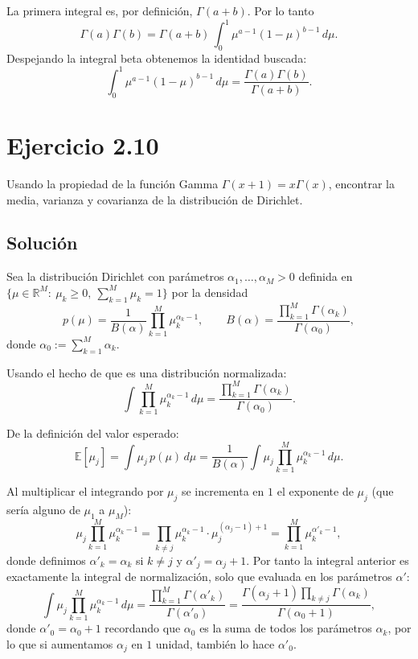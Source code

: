 \documentclass{article}
\begin{document}
La primera integral es, por definición, \(\Gamma(a+b)\). Por lo tanto
\[
\Gamma(a)\Gamma(b)=\Gamma(a+b)\,
\int_{0}^{1} \mu^{a-1}(1-\mu)^{b-1}\,d\mu.
\]
Despejando la integral beta obtenemos la identidad buscada:
\[
\boxed{
\int_{0}^{1} \mu^{a-1}(1-\mu)^{b-1}\,d\mu
=\frac{\Gamma(a)\Gamma(b)}{\Gamma(a+b)}.
}
\]

\section*{Ejercicio 2.10}

Usando la propiedad de la función Gamma
\(\Gamma(x+1)=x\Gamma(x)\), encontrar la media, varianza y covarianza de la distribución de Dirichlet.

\subsection*{Solución}

Sea la distribución Dirichlet con parámetros \(\alpha_1,\dots,\alpha_M>0\) definida en
\(\{\mu\in\mathbb{R}^M:\ \mu_k\ge0,\ \sum_{k=1}^M\mu_k=1\}\) por la densidad
\[
p(\mu)
=\frac{1}{B(\alpha)}\prod_{k=1}^M \mu_k^{\alpha_k-1},
\qquad
B(\alpha)=\frac{\prod_{k=1}^M\Gamma(\alpha_k)}{\Gamma(\alpha_0)},
\]
donde \(\alpha_0:=\sum_{k=1}^M\alpha_k\). 


Usando el hecho de que es una distribución normalizada:
\[
\int\prod_{k=1}^M \mu_k^{\alpha_k-1}\,d\mu
= \frac{\prod_{k=1}^M\Gamma(\alpha_k)}{\Gamma(\alpha_0)}.
\]

De la definición del valor esperado:
\[
\mathbb{E}[\mu_j]
=\int \mu_j\, p(\mu)\,d\mu
=\frac{1}{B(\alpha)} \int \mu_j\prod_{k=1}^M \mu_k^{\alpha_k-1}\,d\mu.
\]

Al multiplicar el integrando por \(\mu_j\) se incrementa en \(1\) el exponente de \(\mu_j\) (que sería alguno de $\mu_1$ a $\mu_M$):
\[
\mu_j\prod_{k=1}^M \mu_k^{\alpha_k-1}
=\prod_{k\neq j}\mu_k^{\alpha_k-1}\cdot \mu_j^{(\alpha_j-1)+1}
=\prod_{k=1}^M \mu_k^{\alpha'_k-1},
\]
donde definimos \(\alpha'_k=\alpha_k\) si \(k\neq j\) y \(\alpha'_j=\alpha_j+1\).
Por tanto la integral anterior es exactamente la integral de normalización, solo que evaluada en los parámetros \(\alpha'\):
\[
\int \mu_j\prod_{k=1}^M \mu_k^{\alpha_k-1}\,d\mu
= \frac{\prod_{k=1}^M\Gamma(\alpha'_k)}{\Gamma(\alpha'_0)}
= \frac{\Gamma(\alpha_j+1)\prod_{k\neq j}\Gamma(\alpha_k)}{\Gamma(\alpha_0+1)},
\]
donde \(\alpha'_0=\alpha_0+1\) recordando que \(\alpha_0\) es la suma de todos los parámetros \(\alpha_k\), por lo que si aumentamos \(\alpha_j\) en $1$ unidad, también lo hace \(\alpha'_0\). 
\end{document}
